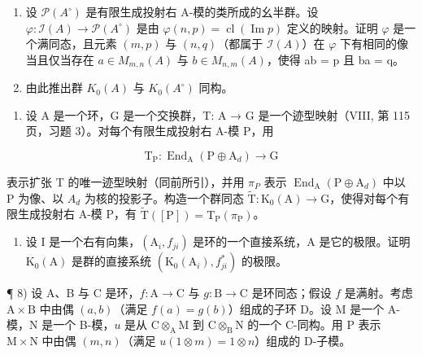 \begin{enumerate}
\def\labelenumi{\alph{enumi})}
\item
  设 \(\mathcal{P}(A^{\circ})\) 是有限生成投射右 A-模的类所成的幺半群。设 \(\varphi: \mathcal{I}(A) \to \mathcal{P}(A^{\circ})\) 是由 \(\varphi(n,p) = \operatorname{cl}(\operatorname{Im}p)\) 定义的映射。证明 \(\varphi\) 是一个满同态，且元素 \((m,p)\) 与 \((n,q)\)（都属于 \(\mathcal{I}(A)\)）在 \(\varphi\) 下有相同的像当且仅当存在 \(a \in M_{m,n}(A)\) 与 \(b \in M_{n,m}(A)\)，使得 ab = p 且 ba = q。
\item
  由此推出群 \(K_{0}(A)\) 与 \(K_{0}(A^{\circ})\) 同构。
\end{enumerate}

\begin{enumerate}
\def\labelenumi{\arabic{enumi})}
\setcounter{enumi}{5}
\tightlist
\item
  设 A 是一个环，G 是一个交换群，T: A → G 是一个迹型映射（VIII, 第 115 页，习题 3）。对每个有限生成投射右 A-模 P，用
\end{enumerate}

\[
\mathrm{T} _ {\mathrm{P}}: \operatorname{End} _ {\mathrm{A}} (\mathrm{P} \oplus \mathrm{A} _ {d}) \longrightarrow \mathrm{G}
\]

表示扩张 T 的唯一迹型映射（同前所引），并用 \(\pi_{P}\) 表示 \(\operatorname{End}_{\mathrm{A}}(\mathrm{P} \oplus \mathrm{A}_{d})\) 中以 P 为像、以 \(A_{d}\) 为核的投影子。构造一个群同态 \(\widetilde{\mathrm{T}} : \mathrm{K}_{0}(\mathrm{A}) \to \mathrm{G}\)，使得对每个有限生成投射右 A-模 P，有 \(\widetilde{\mathrm{T}}([\mathrm{P}]) = \mathrm{T}_{\mathrm{P}}(\pi_{\mathrm{P}})\)。

\begin{enumerate}
\def\labelenumi{\arabic{enumi})}
\setcounter{enumi}{6}
\tightlist
\item
  设 I 是一个右有向集，\((\mathrm{A}_{i}, f_{ji})\) 是环的一个直接系统，A 是它的极限。证明 \(\mathrm{K}_{0}(\mathrm{A})\) 是群的直接系统 \((\mathrm{K}_{0}(\mathrm{A}_{i}), f_{ji}^{*})\) 的极限。
\end{enumerate}

¶ 8) 设 A、B 与 C 是环，\(f: \mathrm{A} \to \mathrm{C}\) 与 \(g: \mathrm{B} \to \mathrm{C}\) 是环同态；假设 \(f\) 是满射。考虑 \(\mathrm{A} \times \mathrm{B}\) 中由偶 \((a, b)\)（满足 \(f(a) = g(b)\)）组成的子环 D。设 M 是一个 A-模，N 是一个 B-模，\(u\) 是从 \(\mathrm{C} \otimes_{\mathrm{A}} \mathrm{M}\) 到 \(\mathrm{C} \otimes_{\mathrm{B}} \mathrm{N}\) 的一个 C-同构。用 P 表示 \(\mathrm{M} \times \mathrm{N}\) 中由偶 \((m, n)\)（满足 \(u(1 \otimes m) = 1 \otimes n\)）组成的 D-子模。

